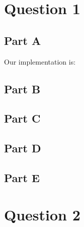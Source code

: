 \documentclass[12pt,a4paper]{scrartcl}
\begin{document}
\section{Question 1}

\subsection{Part A}

Our implementation is:


\subsection{Part B}

\subsection{Part C}

\subsection{Part D}

\subsection{Part E}

\section{Question 2}
\end{document}
